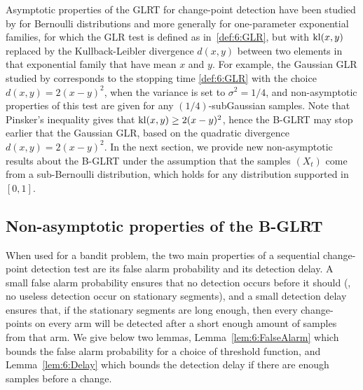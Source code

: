 Asymptotic properties of the GLRT for change-point detection have been studied by \cite{LaiXing10} for Bernoulli distributions and more generally for one-parameter exponential families, for which the GLR test is defined as in~\eqref{def:6:GLR}, but with $\mathrm{kl}(x,y)$ replaced by the Kullback-Leibler divergence $d(x,y)$ between two elements in that exponential family that have mean $x$ and $y$.
For example, the Gaussian GLR studied by \cite{Maillard2018GLR} corresponds to the stopping time \eqref{def:6:GLR} with the choice $d(x,y) = 2(x-y)^2$, when the variance is set to $\sigma^2=1/4$, and non-asymptotic properties of this test are given for any $(1/4)$-subGaussian samples.
Note that Pinsker's inequality gives that $\mathrm{kl}(x,y) \geq 2(x-y)^2$, hence the B-GLRT may stop earlier that the Gaussian GLR, based on the quadratic divergence $d(x,y) = 2(x-y)^2$.
%
In the next section, we provide new non-asymptotic results about the B-GLRT under the assumption that the samples $(X_t)$ come from a sub-Bernoulli distribution, which holds for any distribution supported in $[0,1]$.


\subsection{Non-asymptotic properties of the B-GLRT}\label{subsec:6:PropGLR}

When used for a bandit problem, the two main properties of a sequential change-point detection test are its false alarm probability and its detection delay.
%
A small false alarm probability ensures that no detection occurs before it should (\ie, no useless detection occur on stationary segments), and a small detection delay ensures that, if the stationary segments are long enough, then every change-points on every arm will be detected after a short enough amount of samples from that arm.
%
We give below two lemmas, Lemma~\ref{lem:6:FalseAlarm} which bounds the false alarm probability for a choice of threshold function, and Lemma~\ref{lem:6:Delay} which bounds the detection delay if there are enough samples before a change.



